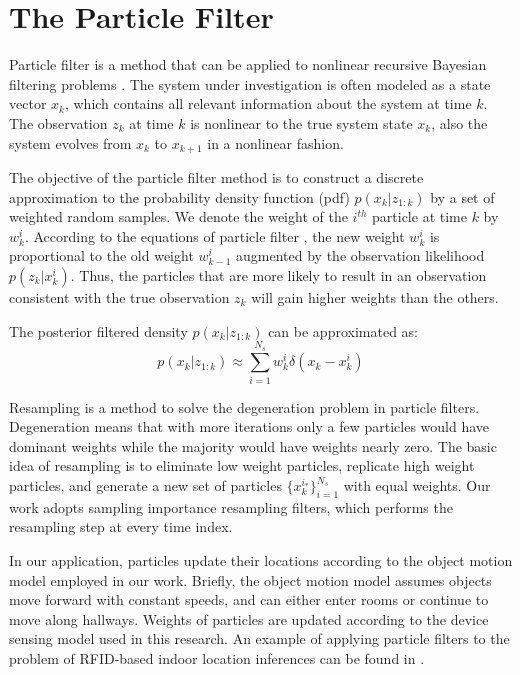 \documentclass[12pt]{report}
\begin{document}
\chapter{The Particle Filter}
\label{sec:particle-filter}
Particle filter is a method that can be applied to nonlinear
recursive Bayesian filtering problems
\cite{arulampalam2002-tutorial}.  The system under investigation is
often modeled as a state vector \(x_k\), which contains all
relevant information about the system at time \(k\).  The
observation \(z_k\) at time \(k\) is nonlinear to the true system
state \(x_k\), also the system evolves from \(x_k\) to \(x_{k+1}\)
in a nonlinear fashion.

The objective of the particle filter method is to construct a
discrete approximation to the probability density function (pdf)
\(p(x_k|z_{1:k})\) by a set of weighted random samples.  We denote
the weight of the \(i^{th}\) particle at time \(k\) by \(w_k^i\).
According to the equations of particle filter
\cite{arulampalam2002-tutorial}, the new weight \(w_k^i\) is
proportional to the old weight \(w_{k-1}^i\) augmented by the
observation likelihood \(p(z_k|x_k^i)\).  Thus, the particles that
are more likely to result in an observation consistent with the
true observation \(z_k\) will gain higher weights than the others.

The posterior filtered density \(p(x_k|z_{1:k})\) can be
approximated as:
\begin{equation}
  p(x_k|z_{1:k})\approx \sum_{i=1}^{N_s} w_k^i \delta(x_k-x_k^i)
\end{equation}

Resampling is a method to solve the degeneration problem in
particle filters.  Degeneration means that with more iterations
only a few particles would have dominant weights while the majority
would have weights nearly zero.  The basic idea of resampling is to
eliminate low weight particles, replicate high weight particles,
and generate a new set of particles \(\{x_k^{i_*}\}_{i=1}^{N_s}\)
with equal weights.  Our work adopts sampling importance resampling
filters, which performs the resampling step at every time index.

In our application, particles update their locations according to
the object motion model employed in our work.  Briefly, the object
motion model assumes objects move forward with constant speeds, and
can either enter rooms or continue to move along hallways.  Weights
of particles are updated according to the device sensing model
\cite{chen2010-leveraging} used in this research.  An example of
applying particle filters to the problem of RFID-based indoor
location inferences can be found in \cite{yu2013-rfid}.
\end{document}
